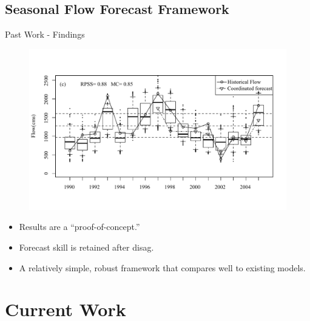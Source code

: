 \documentclass[compress]{beamer}
\begin{document}
\subsection{Seasonal Flow Forecast Framework}
\begin{frame}{Past Work - Findings}
%
\begin{figure}[htbp]
   \centering
   \includegraphics[width=.9\textwidth]{figs/figure-9b.pdf} 
\end{figure}


\begin{itemize}
\item Results are a ``proof-of-concept.''
\item Forecast skill is retained after disag.
\item A relatively simple, robust framework that compares well to existing models.
\end{itemize}

\end{frame}

\section{Current Work}
\end{document}
